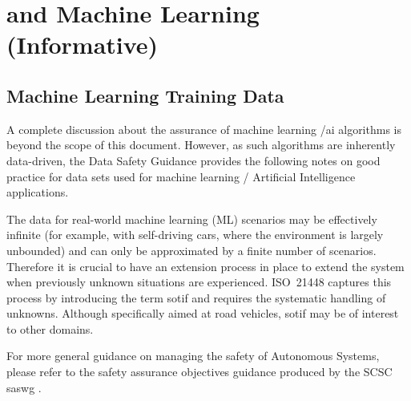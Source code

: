 %
%
\section{ and Machine Learning (Informative)} \label{bkm:MachineLearning}



\subsection{Machine Learning Training Data}
A complete discussion about the assurance of machine learning /\gls{ai} algorithms is beyond the scope of this document.
However, as such algorithms are inherently data-driven, the Data Safety Guidance provides the following notes on good practice for data sets used for machine learning / Artificial Intelligence applications.

The data for real-world machine learning
(ML)
scenarios may be effectively infinite (for example, with self-driving cars, where the environment is largely unbounded) and can only be approximated by a finite number of scenarios.
Therefore it is crucial to have an extension process in place to extend the system when previously unknown situations are experienced. 
ISO~21448 \cite{citation:ISO21448} captures this process by introducing the term \gls{sotif} and requires the systematic handling of unknowns. Although specifically aimed at road vehicles, \gls{sotif} may be of interest to other domains.

For more general guidance on managing the safety of Autonomous Systems, please refer to the safety assurance objectives guidance produced by the SCSC \gls{saswg} \cite{citation:SASWG:Objectives}.

